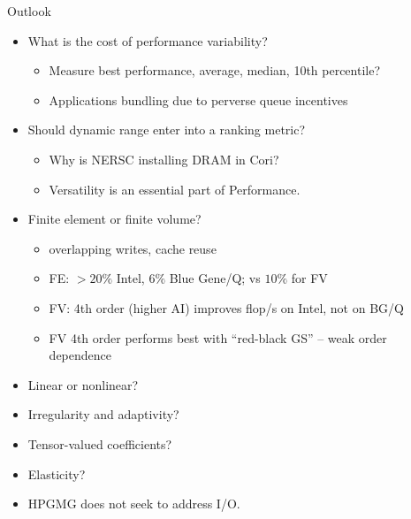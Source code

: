\documentclass{beamer}
\begin{document}
\begin{frame}{Outlook}
  \begin{itemize}
  \item What is the cost of performance variability?
    \begin{itemize}
    \item Measure best performance, average, median, 10th percentile?
    \item Applications bundling due to perverse queue incentives
    \end{itemize}
  \item Should dynamic range enter into a ranking metric?
    \begin{itemize}
    \item Why is NERSC installing DRAM in Cori?
    \item Versatility is an essential part of Performance.
    \end{itemize}
  \item Finite element or finite volume?
    \begin{itemize}
    \item overlapping writes, cache reuse
    \item FE: $>20\%$ Intel, $6\%$ Blue Gene/Q; vs $10\%$ for FV
    \item FV: 4th order (higher AI) improves flop/s on Intel, not on BG/Q
    \item FV 4th order performs best with ``red-black GS'' -- weak order dependence
    \end{itemize}
  \item Linear or nonlinear?
  \item Irregularity and adaptivity?
  \item Tensor-valued coefficients?
  \item Elasticity?
  \item HPGMG does not seek to address I/O.
  \end{itemize}
\end{frame}
\end{document}
